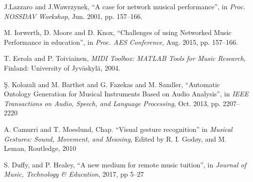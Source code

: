 
J.Lazzaro and J.Wawrzynek, ``A case for network musical performance'', in \emph{Proc. NOSSDAV Workshop}, Jun. 2001, pp. 157--166. 


M. Iorwerth, D. Moore and D. Knox, ``Challenges of using Networked Music Performance in education'', in  \emph{Proc. AES Conference}, Aug. 2015, pp. 157--166. 


T. Eerola and P. Toiviainen, \emph{MIDI Toolbox: MATLAB Tools for Music Research}, Finland: University of Jyv{\"a}skyl{\"a},  2004.

\c{S}. Kolozali and M. Barthet and G. Fazekas and M. Sandler, ``Automatic Ontology Generation for Musical Instruments Based on Audio Analysis'', in \emph{IEEE Transactions on Audio, Speech, and Language Processing}, Oct. 2013, pp. {2207--2220}

A. Camurri and T. Moeslund, Chap. ``Visual gesture recognition'' in \emph{Musical Gestures: Sound, Movement, and Meaning}, Edited by R. I. God{\o}y, and M. Leman, Routledge, 2010

S. Duffy, and P. Healey, ``A new medium for remote music tuition'', in \emph{Journal of Music, Technology \& Education}, 2017, pp 5--27

%	
%	
%	
%	
%	
%	
